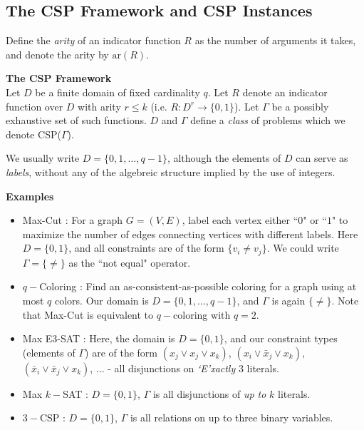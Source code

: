 \subsection{The CSP Framework and CSP Instances}
Define the \textit{arity} of an indicator function $R$ as the number of arguments it takes, and denote the arity by $\text{ar}(R)$.

\begin{definition}
\textbf{The CSP Framework} \\
Let $D$ be a finite domain of fixed cardinality $q$. 
Let $R$ denote an indicator function over $D$ with arity $r \leq k$ (i.e. $R:D^r \to \{0,1\}$). 
Let $\Gamma$ be a possibly exhaustive set of such functions. 
$D$ and $\Gamma$ define a \textit{class} of problems which we denote CSP($\Gamma$).
\label{def:CSPframework}
\end{definition}

We usually write $D = \{0,1,\ldots,q-1\}$, although the elements of $D$ can serve as \textit{labels}, without any of the algebreic structure implied by the use of integers.

\textbf{Examples}
\begin{itemize}
\item Max-Cut : For a graph $G = (V,E)$, label each vertex either ``$0$" or ``$1$" to maximize the number of edges connecting vertices with different labels.   
Here $D = \{0,1\}$, and all constraints are of the form $\{v_i \neq v_j\}$. We could write $\Gamma = \{\neq\}$ as the ``not equal" operator. 
\item $q-$Coloring : Find an as-consistent-as-possible coloring for a graph using at most $q$ colors. 
Our domain is $D = \{0,1,\ldots,q-1\}$, and $\Gamma$ is again $\{\neq\}$. 
Note that Max-Cut is equivalent to $q-$coloring with $q = 2$.
\item Max E3-SAT : Here, the domain is $D = \{0,1\}$, and our constraint types (elements of $\Gamma$) are of the form $(x_j \vee x_j \vee x_k)$, $(x_i\vee \bar{x}_j \vee x_k)$, $(\bar{x}_i \vee \bar{x}_j \vee x_k)$, $\ldots$ - all disjunctions on \textit{`E'xactly} $3$ literals. 
\item Max $k-$SAT : $D = \{0,1\}$, $\Gamma$ is all disjunctions of \textit{up to} $k$ literals.
\item $3-$CSP : $D = \{0,1\}$, $\Gamma$ is all relations on up to three binary variables.
\end{itemize}

